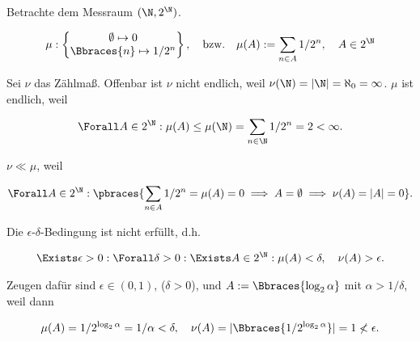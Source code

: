 \begin{solution}

\phantom{}


Betrachte dem Messraum $(\N, 2^\N)$.

\begin{align*}
    \mu:
        \begin{Bmatrix}
            \emptyset \mapsto 0 \\
            \Bbraces{n} \mapsto 1/2^n
        \end{Bmatrix},
    \quad
    \text{bzw.}
    \quad
    \mu(A) := \sum_{n \in A} 1 / 2^n,
    \quad
    A \in 2^\N
\end{align*}

Sei $\nu$ das Zählmaß.
Offenbar ist $\nu$ nicht endlich, weil $\nu(\N) = |\N| = \aleph_0 = \infty$.
$\mu$ ist endlich, weil

\begin{align*}
    \Forall A \in 2^\N:
        \mu(A) \leq \mu(\N) = \sum_{n \in \N} 1 / 2^n = 2 < \infty.
\end{align*}

$\nu \ll \mu$, weil

\begin{align*}
    \Forall A \in 2^\N:
        \pbraces
        {
            \sum_{n \in A} 1/2^n = \mu(A) = 0
            \implies
            A = \emptyset
            \implies
            \nu(A) = |A| = 0
        }.
\end{align*}

Die $\epsilon$-$\delta$-Bedingung ist nicht erfüllt, d.h.

\begin{align*}
    \Exists \epsilon > 0:
        \Forall \delta > 0:
            \Exists A \in 2^\N:
                \mu(A) < \delta,
                \quad
                \nu(A) > \epsilon.
\end{align*}

Zeugen dafür sind $\epsilon \in (0, 1)$, ($\delta > 0$), und $A := \Bbraces{\log_2 \alpha}$ mit $\alpha > 1 / \delta$, weil dann

\begin{align*}
    \mu(A) = 1 / 2^{\log_2 \alpha} = 1 / \alpha < \delta,
    \quad
    \nu(A) = |\Bbraces{1 / 2^{\log_2 \alpha}}| = 1 \not < \epsilon.
\end{align*}

\end{solution}

